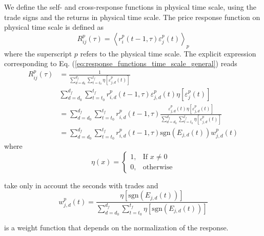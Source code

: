 We define the self- and cross-response functions in physical time scale, using
the trade signs and the returns in physical time scale. The price response
function on physical time scale is defined as
\begin{equation}\label{eq:response_functions_time_scale_general}
    R^{p}_{ij}\left(\tau\right)=\left\langle r^{p}_{i}\left(t-1, \tau\right)
    \varepsilon_{j}^{p} \left(t\right)
    \right\rangle _{p}
\end{equation}
where the superscript $p$ refers to the physical time scale. The explicit
expression corresponding to Eq.
(\ref{eq:response_functions_time_scale_general}) reads
\begin{align}\label{eq:response_seconds_explicit}
    R_{ij}^{p}\left(\tau\right)&=\frac{1}{\sum_{d=d_{0}}^{d_{f}}
    \sum_{t=t_{0}}^{t_{f}} \eta\left[ \varepsilon_{j,d}^{p}
    \left(t\right)\right]} \nonumber \\
    &\sum_{d=d_{0}}^{d_{f}} \sum_{t=t_{0}}^{t_{f}}
    r^{p}_{i,d}\left(t-1,\tau\right) \varepsilon_{j,d}^{p}\left(t\right)
    \eta\left[\varepsilon_{j}^{p} \left(t\right)\right] \\
    &=\sum_{d=d_{0}}^{d_{f}}\sum_{t=t_{0}}^{t_{f}}r^{p}_{i,d}
    \left(t-1,\tau\right) \frac{\varepsilon_{j,d}^{p}\left(t\right)
    \eta\left[\varepsilon_{j,d}^{p} \left( t\right)\right]}
    {\sum_{d=d_{0}}^{d_{f}}\sum_{t=t_{0}}^{t_{f}}\eta
    \left[\varepsilon_{j,d}^{p} \left(t\right)\right]} \nonumber \\
    &=\sum_{d=d_{0}}^{d_{f}}\sum_{t=t_{0}}^{t_{f}}r^{p}_{i,d}
    \left(t-1,\tau\right) \text{sgn}\left(E_{j,d}\left(t\right)\right)
    w_{j,d}^{p}\left(t\right)
\end{align}
where
\begin{equation}
    \eta\left(x\right)=\left\{ \begin{array}{cc}
    1, & \text{If }x\ne0 \\
    0, & \text{otherwise}
    \end{array}\right.
\end{equation}

take only in account the seconds with trades and
\begin{equation}
    w_{j,d}^{p}\left(t\right) = \frac{\eta\left[\text{sgn}
    \left(E_{j,d}\left( t\right)\right)\right]}{\sum_{d=d_{0}}^{d_{f}}
    \sum_{t=t_{0}}^{t_{f}} \eta\left[\text{sgn}\left(E_{j,d}
    \left(t\right)\right)\right]}
\end{equation}

is a weight function that depends on the normalization of the response.

